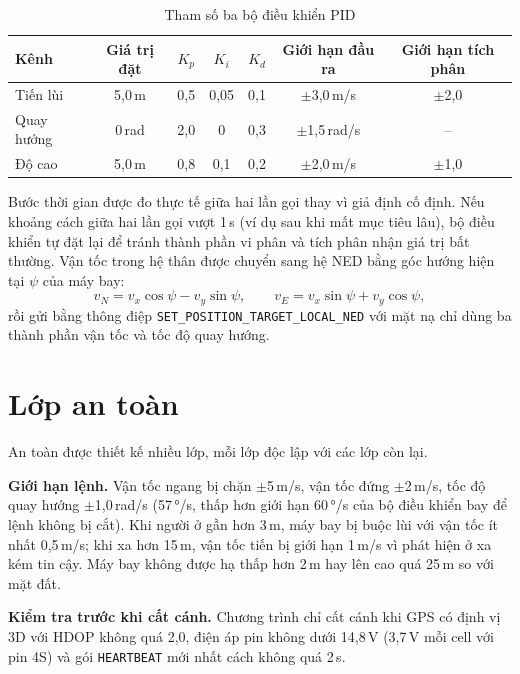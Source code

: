 \begin{table}[H]
\centering
\caption{Tham số ba bộ điều khiển PID}
\label{tab:pid}
\small
\renewcommand{\arraystretch}{1.15}
\begin{tabular}{@{}lcccccc@{}}
\toprule
\textbf{Kênh} & \textbf{Giá trị đặt} & \textbf{$K_p$} & \textbf{$K_i$} & \textbf{$K_d$} & \textbf{Giới hạn đầu ra} & \textbf{Giới hạn tích phân}\\
\midrule
Tiến lùi & 5,0\,m & 0,5 & 0,05 & 0,1 & $\pm$3,0\,m/s & $\pm$2,0\\
Quay hướng & 0\,rad & 2,0 & 0 & 0,3 & $\pm$1,5\,rad/s & --\\
Độ cao & 5,0\,m & 0,8 & 0,1 & 0,2 & $\pm$2,0\,m/s & $\pm$1,0\\
\bottomrule
\end{tabular}
\end{table}

Bước thời gian được đo thực tế giữa hai lần gọi thay vì giả định cố định. Nếu khoảng cách giữa hai lần gọi vượt 1\,s (ví dụ sau khi mất mục tiêu lâu), bộ điều khiển tự đặt lại để tránh thành phần vi phân và tích phân nhận giá trị bất thường. Vận tốc trong hệ thân được chuyển sang hệ NED bằng góc hướng hiện tại $\psi$ của máy bay:
\begin{equation}
v_N = v_x \cos\psi - v_y \sin\psi, \qquad v_E = v_x \sin\psi + v_y \cos\psi,
\end{equation}
rồi gửi bằng thông điệp \texttt{SET\_POSITION\_TARGET\_LOCAL\_NED} với mặt nạ chỉ dùng ba thành phần vận tốc và tốc độ quay hướng.

\section{Lớp an toàn}
\label{sec:antoan}

An toàn được thiết kế nhiều lớp, mỗi lớp độc lập với các lớp còn lại.

\textbf{Giới hạn lệnh.} Vận tốc ngang bị chặn $\pm$5\,m/s, vận tốc đứng $\pm$2\,m/s, tốc độ quay hướng $\pm$1,0\,rad/s (57\,°/s, thấp hơn giới hạn 60\,°/s của bộ điều khiển bay để lệnh không bị cắt). Khi người ở gần hơn 3\,m, máy bay bị buộc lùi với vận tốc ít nhất 0,5\,m/s; khi xa hơn 15\,m, vận tốc tiến bị giới hạn 1\,m/s vì phát hiện ở xa kém tin cậy. Máy bay không được hạ thấp hơn 2\,m hay lên cao quá 25\,m so với mặt đất.

\textbf{Kiểm tra trước khi cất cánh.} Chương trình chỉ cất cánh khi GPS có định vị 3D với HDOP không quá 2,0, điện áp pin không dưới 14,8\,V (3,7\,V mỗi cell với pin 4S) và gói \texttt{HEARTBEAT} mới nhất cách không quá 2\,s.

